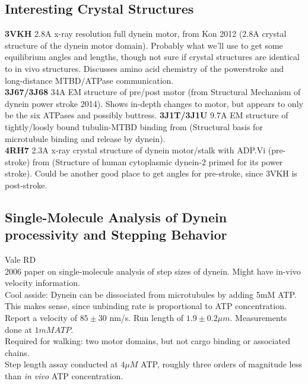 \documentclass[10pt]{article} %
\begin{document}
\subsection{Interesting Crystal Structures}
\textbf{3VKH} 2.8A x-ray resolution full dynein motor, from Kon 2012 (2.8A crystal structure of the dynein motor domain). Probably what we'll use to get some equilibrium angles and lengths, though not sure if crystal structures are identical to in vivo structures. Discusses amino acid chemistry of the powerstroke and long-distance MTBD/ATPase communication.\\
\textbf{3J67/3J68} 34A EM structure of pre/post motor (from Structural Mechanism of dynein power stroke 2014). Shows in-depth changes to motor, but appears to only be the six ATPases and possibly buttress.
\textbf{3J1T/3J1U} 9.7A EM structure of tightly/loosly bound tubulin-MTBD binding from (Structural basis for microtubule binding and release by dynein).\\
\textbf{4RH7} 2.3A x-ray crystal structure of dynein motor/stalk with ADP.Vi (pre-stroke) from (Structure of human cytoplasmic dynein-2 primed for its power stroke). Could be another good place to get angles for pre-stroke, since 3VKH is post-stroke.\\

\subsection{Single-Molecule Analysis of Dynein processivity and Stepping Behavior}
Vale RD\\
2006 paper on single-molecule analysis of step sizes of dynein. Might have in-vivo velocity information.\\

Cool asside: Dynein can be dissociated from microtubules by adding 5mM ATP. This makes sense, since unbinding rate is proportional to ATP concentration.\\

Report a velocity of $85\pm30$ nm/s. Run length of $1.9\pm0.2\mu m$. Measurements done at $1mM ATP$.\\

Required for walking: two motor domains, but not cargo binding or associated chains.\\

Step length assay conducted at $4 \mu M$ ATP, roughly three orders of magnitude less than \textit{in vivo} ATP concentration.\\ 
\end{document}

